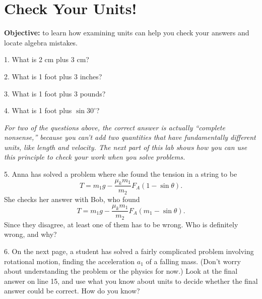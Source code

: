 \section{Check Your Units!}


\makelabheader %


\vspace{0.1in}
\textbf{Objective:} to learn how examining units can help you check your answers and locate algebra mistakes. 
\bigskip

1. What is 2 cm plus 3 cm?
\vspace{0.2in}

2. What is 1 foot plus 3 inches?
\vspace{0.2in}

3. What is 1 foot plus 3 pounds?
\vspace{0.2in}

4. What is 1 foot plus $\sin 30 ^\circ $?
\vspace{0.2in}

\textit{For two of the questions above, the correct answer is actually ``complete nonsense,'' because you can't add two quantities that have fundamentally different units, like length and velocity.  The next part of this lab shows how you can use this principle to check your work when you solve problems.}

5. Anna has solved a problem where she found the tension in a string to be 
$$T = m_1g - \frac{\mu_k m_1}{m_2} F_A (1 - \sin\theta).$$ 
She checks her answer with Bob, who found 
$$T = m_1g - \frac{\mu_k m_1}{m_2} F_A (m_1 - \sin\theta).$$ 
Since they disagree, at least one of them has to be wrong.  Who is definitely wrong, and why?
\vspace{0.7in}

6. On the next page, a student has solved a fairly complicated problem involving rotational motion, finding the acceleration $a_1$ of a falling mass. (Don't worry about understanding the problem or the physics for now.)  Look at the final answer on line 15, and use what you know about units to decide whether the final answer could be correct.  How do you know?
\vspace{0.7in}

